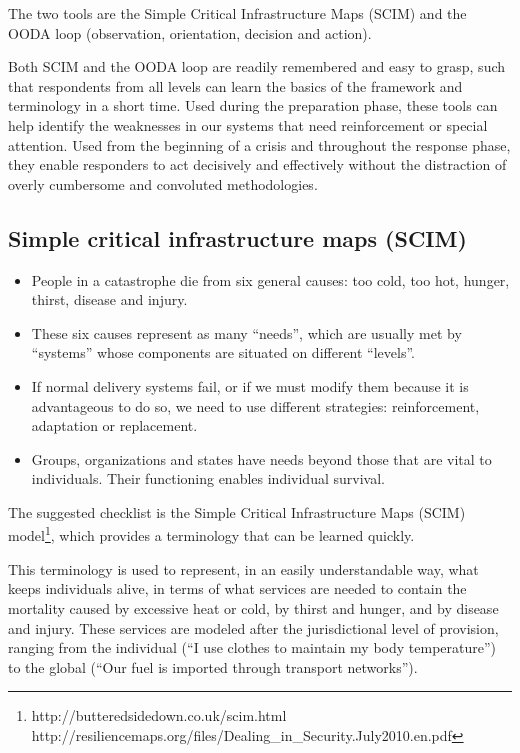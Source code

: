 \documentclass[12pt, a4]{scrartcl}
\begin{document}
The two tools are the Simple Critical Infrastructure Maps (SCIM) and the OODA loop (observation, orientation, decision and action). 

Both SCIM and the OODA loop are readily remembered and easy to grasp, such that respondents from all levels can learn the basics of the framework and terminology in a short time. Used during the preparation phase, these tools can help identify the weaknesses in our systems that need reinforcement or special attention. Used from the beginning of a crisis and throughout the response phase, they enable responders to act decisively and effectively without the distraction of overly cumbersome and convoluted methodologies.


\subsection{Simple critical infrastructure maps (SCIM)}
\begin{mdframed}[leftmargin=10pt,rightmargin=10pt]
\begin{itemize}
	\item People in a catastrophe die from six general causes: too cold, too hot, hunger, thirst, disease and injury.
	\item These six causes represent as many “needs”, which are usually met by “systems” whose components are situated on different “levels”.
	\item If normal delivery systems fail, or if we must modify them because it is advantageous to do so, we need to use different strategies: reinforcement, adaptation or replacement.
	\item Groups, organizations and states have needs beyond those that are vital to individuals. Their functioning enables individual survival.
\end{itemize}
\end{mdframed}

The suggested checklist is the Simple Critical Infrastructure Maps (SCIM) model\footnote{ http://butteredsidedown.co.uk/scim.html http://resiliencemaps.org/files/Dealing_in_Security.July2010.en.pdf}, which provides a terminology that can be learned quickly.

This terminology is used to represent, in an easily understandable way, what keeps individuals alive, in terms of what services are needed to contain the mortality caused by excessive heat or cold, by thirst and hunger, and by disease and injury. These services are modeled after the jurisdictional level of provision, ranging from the individual (“I use clothes to maintain my body temperature”) to the global (“Our fuel is imported through transport networks”).
\end{document}
